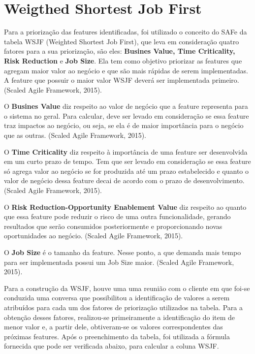 \section{Weigthed Shortest Job First}
	
	Para a priorização das features identificadas, foi utilizado o conceito do SAFe da tabela WSJF (Weighted Shortest Job First), que leva em consideração quatro fatores para a sua priorização, são eles: \textbf{Busines Value, Time Criticality, Risk Reduction} e \textbf{Job Size}.  Ela tem como objetivo priorizar as features que agregam maior valor ao negócio e que são mais rápidas de serem implementadas. A feature que possuir o maior valor WSJF deverá ser implementada primeiro. (Scaled Agile Framework, 2015).

	O \textbf{Busines Value} diz respeito ao valor de negócio que a feature representa para o sistema no geral. Para calcular, deve ser levado em consideração se essa feature traz impactos ao negócio, ou seja, se ela é de maior importância para o negócio que as outras. (Scaled Agile Framework, 2015).

	O \textbf{Time Criticality} diz respeito à importância de uma feature ser desenvolvida em um curto prazo de tempo. Tem que ser levado em consideração se essa feature só agrega valor ao negócio se for produzida até um prazo estabelecido e quanto o valor de negócio dessa feature decai de acordo com o prazo de desenvolvimento. (Scaled Agile Framework, 2015).

	O \textbf{Risk Reduction-Opportunity Enablement Value} diz respeito ao quanto que essa feature pode reduzir o risco de uma outra funcionalidade, gerando resultados que serão consumidos posteriormente e proporcionando novas oportunidades ao negócio. (Scaled Agile Framework, 2015).

	O \textbf{Job Size} é o tamanho da feature. Nesse ponto, a que demanda mais tempo para ser implementada possui um Job Size maior. (Scaled Agile Framework, 2015).

	Para a construção da WSJF, houve uma uma reunião com o cliente em que foi-se conduzida uma conversa que possibilitou a identificação de valores a serem atribuídos para cada um dos fatores de priorização utilizados na tabela. Para a obtenção desses fatores, realizou-se primeiramente a identificação do item de menor valor e, a partir dele, obtiveram-se os valores correspondentes das próximas features. Após o preenchimento da tabela, foi utilizada a fórmula fornecida que pode ser verificada abaixo, para calcular a coluna WSJF.

